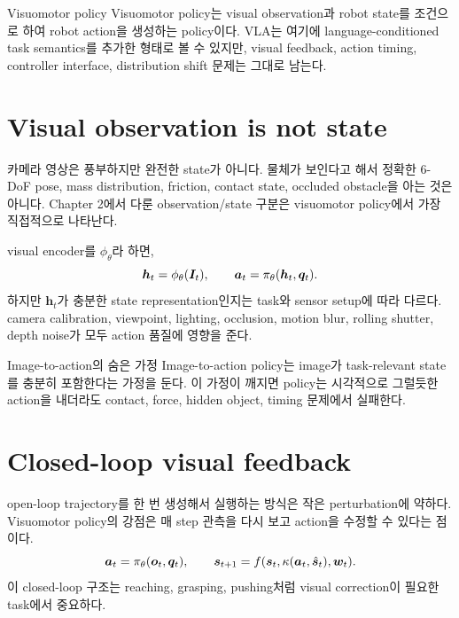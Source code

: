 \begin{definitionbox}{Visuomotor policy}
Visuomotor policy는 visual observation과 robot state를 조건으로 하여 robot action을 생성하는 policy이다. VLA는 여기에 language-conditioned task semantics를 추가한 형태로 볼 수 있지만, visual feedback, action timing, controller interface, distribution shift 문제는 그대로 남는다.
\end{definitionbox}

\section{Visual observation is not state}

카메라 영상은 풍부하지만 완전한 state가 아니다. 물체가 보인다고 해서 정확한 6-DoF pose, mass distribution, friction, contact state, occluded obstacle을 아는 것은 아니다. Chapter 2에서 다룬 observation/state 구분은 visuomotor policy에서 가장 직접적으로 나타난다.

visual encoder를 $\phi_{\theta}$라 하면,
\begin{equation}
  \bm{h}_t
  =
  \phi_{\theta}(\bm{I}_t),
  \qquad
  \bm{a}_t
  =
  \pi_{\theta}(\bm{h}_t,\bm{q}_t).
  \label{eq:visual-encoder-policy}
\end{equation}
하지만 $\bm{h}_t$가 충분한 state representation인지는 task와 sensor setup에 따라 다르다. camera calibration, viewpoint, lighting, occlusion, motion blur, rolling shutter, depth noise가 모두 action 품질에 영향을 준다.

\begin{warningbox}{Image-to-action의 숨은 가정}
Image-to-action policy는 image가 task-relevant state를 충분히 포함한다는 가정을 둔다. 이 가정이 깨지면 policy는 시각적으로 그럴듯한 action을 내더라도 contact, force, hidden object, timing 문제에서 실패한다.
\end{warningbox}

\section{Closed-loop visual feedback}

open-loop trajectory를 한 번 생성해서 실행하는 방식은 작은 perturbation에 약하다. Visuomotor policy의 강점은 매 step 관측을 다시 보고 action을 수정할 수 있다는 점이다.
\begin{equation}
  \bm{a}_t = \pi_{\theta}(\bm{o}_t,\bm{q}_t),
  \qquad
  \bm{s}_{t+1}=f(\bm{s}_t,\kappa(\bm{a}_t,\hat{\bm{s}}_t),\bm{w}_t).
  \label{eq:closed-loop-visuomotor}
\end{equation}
이 closed-loop 구조는 reaching, grasping, pushing처럼 visual correction이 필요한 task에서 중요하다.

